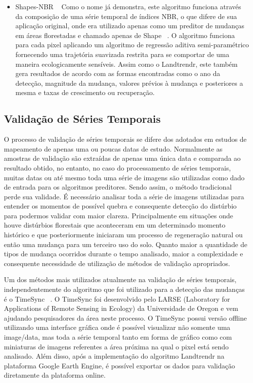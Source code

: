 \documentclass[twocolumn]{article}
\begin{document}
\begin{itemize}
  \item Shapes-NBR ~\cite{Meyer2013, Moisen2016} Como o nome já demonstra, este algoritmo funciona através da composição de uma série temporal de índices NBR, o que difere de sua aplicação original, onde era utilizado apenas como um preditor de mudanças em áreas florestadas e chamado apenas de Shape ~\cite{SCHROEDER2017230}. O algoritmo funciona para cada pixel aplicando um algoritmo de regressão aditiva semi-paramétrico fornecendo uma trajetória suavizada restrita para se comportar de uma maneira ecologicamente sensíveis. Assim como o Landtrendr, este também gera resultados de acordo com as formas encontradas como o ano da detecção, magnitude da mudança, valores prévios à mudança e posteriores a mesma e taxas de crescimento ou recuperação.
  
\end{itemize}

\subsection{Validação de Séries Temporais}
O processo de validação de séries temporais se difere dos adotados em estudos de mapeamento de apenas uma ou poucas datas de estudo. Normalmente as amostras de validação são extraídas de apenas uma única data e comparada ao resultado obtido, no entanto, no caso do processamento de séries temporais, muitas datas ou até mesmo toda uma série de imagens são utilizadas como dado de entrada para os algoritmos preditores. Sendo assim, o método tradicional perde sua validade. É necessário analisar toda a série de imagens utilizadas para entender os momentos de possível quebra e consequente detecção do distúrbio para podermos validar com maior clareza. Principalmente em situações onde houve distúrbios florestais que aconteceram em um determinado momento histórico e que posteriormente iniciaram um processo de regeneração natural ou então uma mudança para um terceiro uso do solo. Quanto maior a quantidade de tipos de mudança ocorridos durante o tempo analisado, maior a complexidade e consequente necessidade de utilização de métodos de validação apropriados. 
\par
Um dos métodos mais utilizados atualmente na validação de séries temporais, independentemente do algoritmo que foi utilizado para a detecção das mudanças é o TimeSync ~\cite{COHEN20102911}. O TimeSync foi desenvolvido pelo LARSE (Laboratory for Applications of Remote Sensing in Ecology) da Universidade de Oregon e vem ajudando pesquisadores da área neste processo. O TimeSync possui versão offline utilizando uma interface gráfica onde é possível visualizar não somente uma image/data, mas toda a série temporal tanto em forma de gráfico como com miniaturas de imagens referentes a área próxima na qual o pixel está sendo analisado. Além disso, após a implementação do algoritmo Landtrendr na plataforma Google Earth Engine, é possível exportar os dados para validação diretamente da plataforma online. 
\end{document}
